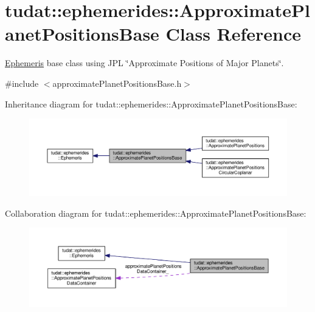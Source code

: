 \hypertarget{classtudat_1_1ephemerides_1_1ApproximatePlanetPositionsBase}{}\section{tudat\+:\+:ephemerides\+:\+:Approximate\+Planet\+Positions\+Base Class Reference}
\label{classtudat_1_1ephemerides_1_1ApproximatePlanetPositionsBase}


\hyperlink{classtudat_1_1ephemerides_1_1Ephemeris}{Ephemeris} base class using J\+PL \char`\"{}\+Approximate Positions of Major Planets\char`\"{}.  




{\ttfamily \#include $<$approximate\+Planet\+Positions\+Base.\+h$>$}



Inheritance diagram for tudat\+:\+:ephemerides\+:\+:Approximate\+Planet\+Positions\+Base\+:
\nopagebreak
\begin{figure}[H]
\begin{center}
\leavevmode
\includegraphics[width=350pt]{classtudat_1_1ephemerides_1_1ApproximatePlanetPositionsBase__inherit__graph}
\end{center}
\end{figure}


Collaboration diagram for tudat\+:\+:ephemerides\+:\+:Approximate\+Planet\+Positions\+Base\+:
\nopagebreak
\begin{figure}[H]
\begin{center}
\leavevmode
\includegraphics[width=350pt]{classtudat_1_1ephemerides_1_1ApproximatePlanetPositionsBase__coll__graph}
\end{center}
\end{figure}
